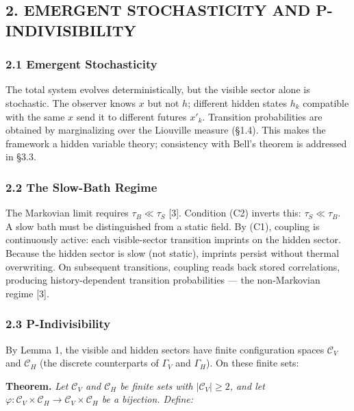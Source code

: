 \documentclass[
]{article}
\begin{document}
\hypertarget{emergent-stochasticity-and-p-indivisibility}{%
\subsection{2. EMERGENT STOCHASTICITY AND
P-INDIVISIBILITY}\label{emergent-stochasticity-and-p-indivisibility}}

\hypertarget{emergent-stochasticity}{%
\subsubsection{2.1 Emergent
Stochasticity}\label{emergent-stochasticity}}

The total system evolves deterministically, but the visible sector alone
is stochastic. The observer knows \(x\) but not \(h\); different hidden
states \(h_k\) compatible with the same \(x\) send it to different
futures \(x'_k\). Transition probabilities are obtained by marginalizing
over the Liouville measure (§1.4). This makes the framework a hidden
variable theory; consistency with Bell's theorem is addressed in §3.3.

\hypertarget{the-slow-bath-regime}{%
\subsubsection{2.2 The Slow-Bath Regime}\label{the-slow-bath-regime}}

The Markovian limit requires \(\tau_B \ll \tau_S\) {[}3{]}. Condition
(C2) inverts this: \(\tau_S \ll \tau_B\). A slow bath must be
distinguished from a static field. By (C1), coupling is continuously
active: each visible-sector transition imprints on the hidden sector.
Because the hidden sector is slow (not static), imprints persist without
thermal overwriting. On subsequent transitions, coupling reads back
stored correlations, producing history-dependent transition
probabilities --- the non-Markovian regime {[}3{]}.

\hypertarget{p-indivisibility}{%
\subsubsection{2.3 P-Indivisibility}\label{p-indivisibility}}

By Lemma 1, the visible and hidden sectors have finite configuration
spaces \(\mathcal{C}_V\) and \(\mathcal{C}_H\) (the discrete
counterparts of \(\Gamma_V\) and \(\Gamma_H\)). On these finite sets:

\textbf{Theorem.} \emph{Let \(\mathcal{C}_V\) and \(\mathcal{C}_H\) be
finite sets with \(|\mathcal{C}_V| \geq 2\), and let
\(\varphi: \mathcal{C}_V \times \mathcal{C}_H \to \mathcal{C}_V \times \mathcal{C}_H\)
be a bijection. Define:}
\end{document}
